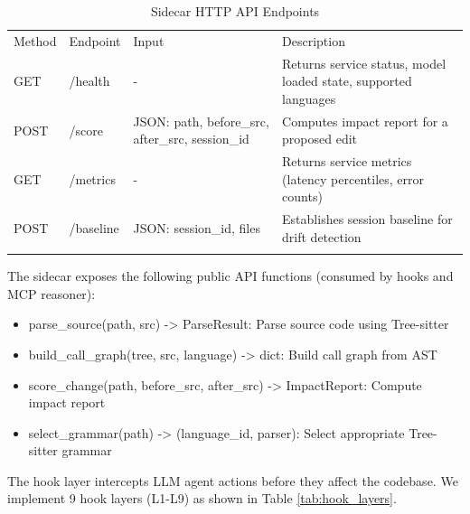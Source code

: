 \begin{table}[t]
    \centering
    \caption{Sidecar HTTP API Endpoints}
    \label{tab:api_endpoints}
    \begin{tabular}{lllp{8cm}}
        \toprule
        Method & Endpoint & Input & Description \\\n        \midrule
        GET & /health & - & Returns service status, model loaded state, supported languages \\\n        POST & /score & JSON: path, before_src, after_src, session_id & Computes impact report for a proposed edit \\\n        GET & /metrics & - & Returns service metrics (latency percentiles, error counts) \\\n        POST & /baseline & JSON: session_id, files & Establishes session baseline for drift detection \\\n        \bottomrule
    \end{tabular}
\end{table}


The sidecar exposes the following public API functions (consumed by hooks and MCP reasoner):

\begin{itemize}
    \item parse_source(path, src) -> ParseResult: Parse source code using Tree-sitter
    \item build_call_graph(tree, src, language) -> dict: Build call graph from AST
    \item score_change(path, before_src, after_src) -> ImpactReport: Compute impact report
    \item select_grammar(path) -> (language_id, parser): Select appropriate Tree-sitter grammar
\end{itemize}


The hook layer intercepts LLM agent actions before they affect the codebase. We implement 9 hook layers (L1-L9) as shown in Table \ref{tab:hook_layers}.

